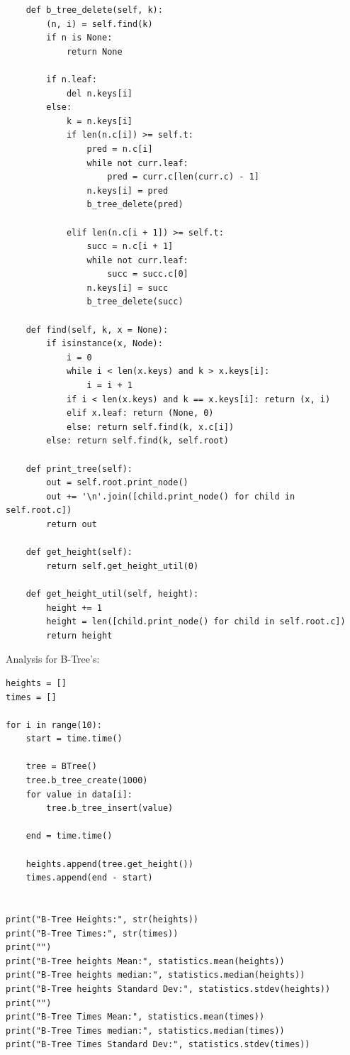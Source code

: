 \documentclass{article}
\begin{document}
\begin{enumerate}
\begin{enumerate}
\begin{lstlisting}
    def b_tree_delete(self, k):
        (n, i) = self.find(k)
        if n is None:
            return None
        
        if n.leaf:
            del n.keys[i]
        else:
            k = n.keys[i]
            if len(n.c[i]) >= self.t:
                pred = n.c[i]
                while not curr.leaf:
                    pred = curr.c[len(curr.c) - 1]
                n.keys[i] = pred
                b_tree_delete(pred)
                
            elif len(n.c[i + 1]) >= self.t:
                succ = n.c[i + 1]
                while not curr.leaf:
                    succ = succ.c[0]
                n.keys[i] = succ
                b_tree_delete(succ)
    
    def find(self, k, x = None):
        if isinstance(x, Node):
            i = 0            
            while i < len(x.keys) and k > x.keys[i]:
                i = i + 1
            if i < len(x.keys) and k == x.keys[i]: return (x, i)
            elif x.leaf: return (None, 0)
            else: return self.find(k, x.c[i])
        else: return self.find(k, self.root)
    
    def print_tree(self):
        out = self.root.print_node()
        out += '\n'.join([child.print_node() for child in self.root.c])
        return out
    
    def get_height(self):
        return self.get_height_util(0)

    def get_height_util(self, height):
        height += 1
        height = len([child.print_node() for child in self.root.c])
        return height      
    \end{lstlisting}

    Analysis for B-Tree's:

    \begin{lstlisting}
heights = []
times = []

for i in range(10):
    start = time.time()
    
    tree = BTree()
    tree.b_tree_create(1000)
    for value in data[i]:
        tree.b_tree_insert(value)
    
    end = time.time()
    
    heights.append(tree.get_height())
    times.append(end - start)

    
print("B-Tree Heights:", str(heights))
print("B-Tree Times:", str(times))
print("")
print("B-Tree heights Mean:", statistics.mean(heights))
print("B-Tree heights median:", statistics.median(heights))
print("B-Tree heights Standard Dev:", statistics.stdev(heights))
print("")
print("B-Tree Times Mean:", statistics.mean(times))
print("B-Tree Times median:", statistics.median(times))
print("B-Tree Times Standard Dev:", statistics.stdev(times))     


\end{lstlisting}
\end{enumerate}
\end{enumerate}
\end{document}
